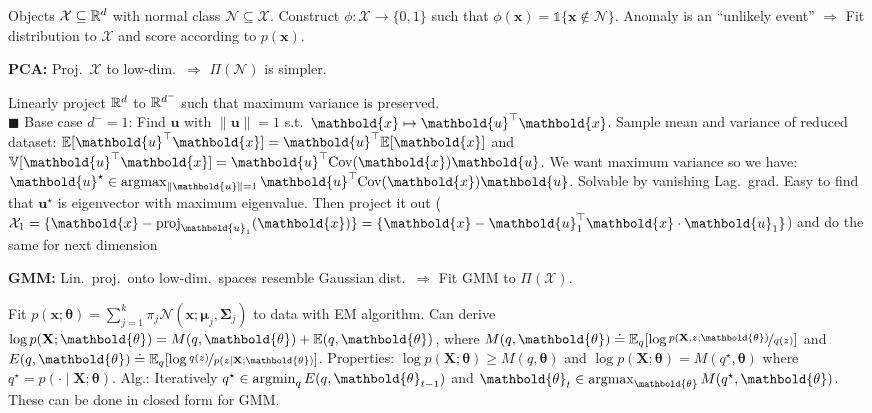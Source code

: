 \documentclass[9pt]{extarticle}
\newenvironment{topic}[1]
{\textbf{\sffamily \colorbox{black}{\rlap{\textbf{\textcolor{white}{#1}}}\hspace{\linewidth}\hspace{-2\fboxsep}}}}
{}
\newenvironment{subtopic}[1]
{\textbf{\sffamily #1:}}
{}
\renewcommand{\mat}[1]{\ensuremath{\mathbf{#1}}}
\renewcommand{\vec}[1]{\ensuremath{\mathbold{#1}}}
\renewcommand{\Var}{\mathbb{V}}
\begin{document}
\begin{multicols*}{3}
    \begin{topic}{Anomaly detection}
        Objects $\mathcal{X} \subseteq \mathbb{R}^d$ with normal class $\mathcal{N} \subseteq \mathcal{X}$.
        Construct $\phi: \mathcal{X} \to \{ 0,1 \}$ such that $\phi(\vec{x}) =
            \mathbb{1}\{\vec{x} \not\in \mathcal{N}\}$. Anomaly is an ``unlikely event'' $\Rightarrow$
        Fit distribution to $\mathcal{X}$ and score according to $p(\vec{x})$.

        \begin{subtopic}{PCA}
            Proj.\ $\mathcal{X}$ to low-dim.\ $\Rightarrow$ $\Pi(\mathcal{N})$ is simpler.

            Linearly project $\mathbb{R}^d$ to $\mathbb{R}^{d^-}$ such that maximum variance is preserved. \\ $\blacksquare$
            Base case $d^- = 1$: Find $\vec{u}$ with $\| \vec{u} \| = 1$ s.t.\ $\vec{x} \mapsto
                \transpose{\vec{u}} \vec{x}$. Sample mean and variance of reduced dataset: $\E[\transpose{\vec{u}}
                    \vec{x}] = \transpose{\vec{u}} \E[\vec{x}]$ and $\Var[\transpose{\vec{u}} \vec{x}] =
                \transpose{\vec{u}} \mathrm{Cov}(\vec{x}) \vec{u}$. We want maximum variance so we have:
            $\vec{u}^\star \in \argmax_{\| \vec{u} \|=1} \transpose{\vec{u}} \mathrm{Cov}(\vec{x}) \vec{u}$.
            Solvable by vanishing Lag.\ grad. Easy to find that $\vec{u}^\star$ is eigenvector with maximum
            eigenvalue. Then project it out ($\mathcal{X}_1 = \{ \vec{x} - \mathrm{proj}_{\vec{u}_1}(\vec{x})
                \} = \{ \vec{x} - \transpose{\vec{u}_1} \vec{x} \cdot \vec{u}_1 \}$) and do the same for next
            dimension

        \end{subtopic}

        \begin{subtopic}{GMM}
            Lin.\ proj.\ onto low-dim.\ spaces resemble Gaussian dist.\ $\Rightarrow$ Fit
            GMM to $\Pi(\mathcal{X})$.

            Fit $p(\vec{x}; \vec{\theta}) = \sum_{j=1}^{k} \pi_j \mathcal{N}(\vec{x}; \vec{\mu}_j,
                \mat{\Sigma}_j)$ to data with EM algorithm. Can derive $\log p(\mat{X}; \vec{\theta}) = M(q,
                \vec{\theta}) + \E(q, \vec{\theta})$, where $M(q, \vec{\theta}) \doteq \E_q [\log
                    \nicefrac{p(\mat{X},z; \vec{\theta})}{q(z)}]$ and $E(q, \vec{\theta}) \doteq \E_q [\log
                    \nicefrac{q(z)}{p(z \mid \mat{X}; \vec{\theta})}]$. Properties: $\log p(\mat{X}; \vec{\theta}) \geq
                M(q, \vec{\theta})$ and $\log p(\mat{X}; \vec{\theta}) = M(q^\star, \vec{\theta})$ where $q^\star =
                p(\cdot \mid \mat{X}; \vec{\theta})$. Alg.: Iteratively $q^\star \in \argmin_q E(q,
                \vec{\theta}_{t-1})$ and $\vec{\theta}_t \in \argmax_{\vec{\theta}} M(q^\star, \vec{\theta})$.
            These can be done in closed form for GMM.


\end{subtopic}
\end{topic}
\end{multicols*}
\end{document}
